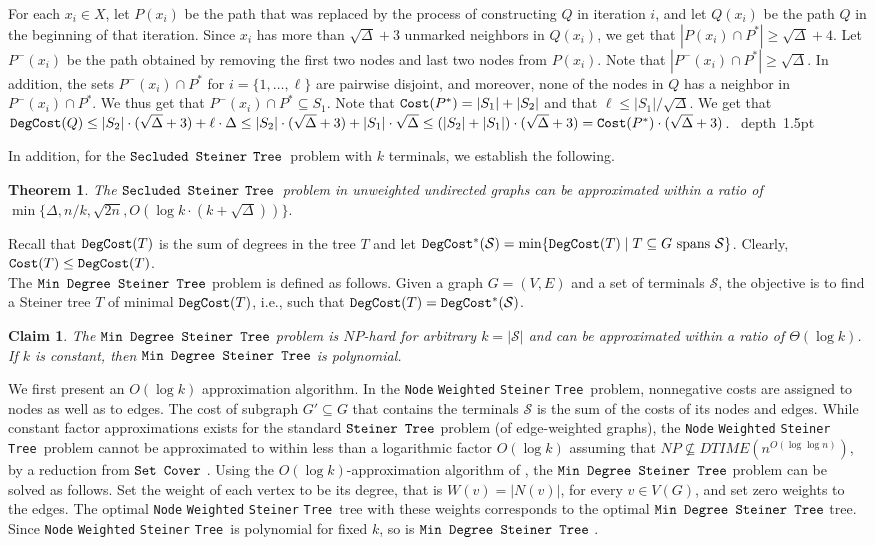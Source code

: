 \documentclass[12pt]{article}
\newtheorem{theorem}{Theorem}[section]
\newtheorem{claim}{Claim}[section]
\def\Cost{\mbox{\tt Cost}}
\def\Proof{\par\noindent{\bf Proof:~}}
\def\blackslug{\hbox{\hskip 1pt \vrule width 4pt height 8pt
    depth 1.5pt \hskip 1pt}}
\def\QED{\quad\blackslug\lower 8.5pt\null\par}
\newcommand{\MAXDEG}[0]{\Delta}
\newcommand{\PS}[0]{$\mbox{\tt Secluded}$ $\mbox{\tt Steiner}$
$\mbox{\tt Tree}$}
\newcommand{\Terminals}[0]{\mathcal{S}}
\newcommand{\Steiner}[0]{\mbox{\tt Steiner Tree}}
\newcommand{\NodeSteiner}[0]{\mbox{\tt Node} \mbox{\tt Weighted}
\mbox{\tt Steiner} \mbox{\tt Tree}}
\newcommand{\PSDeg}[0]{\mbox{\tt Min Degree Steiner Tree}}
\newcommand{\SC}[0]{\mbox{\tt Set Cover}}
\def\Cost{\mbox{\tt Cost}}
\def\DegCost{\mbox{\tt DegCost}}
\def\OptDegCost{\DegCost^{*}}
\begin{document}
For each $x_i \in X$, let $P(x_i)$ be the path that was replaced by the process of constructing $Q$ in iteration $i$, and let $Q(x_i)$ be the path $Q$ in the beginning of that iteration.
Since $x_i$ has more than $\sqrt{\MAXDEG} +3$ unmarked neighbors in $Q(x_i)$, we get that $|P(x_i) \cap P^*| \geq \sqrt{\MAXDEG} +4$.
Let $P^{-}(x_i)$ be the path obtained by removing the first two nodes and last two nodes from $P(x_i)$.
Note that $|P^{-}(x_i) \cap P^*| \geq \sqrt{\MAXDEG}$.
In addition, the sets $P^{-}(x_i) \cap P^*$ for $i=\{1, \ldots, \ell\}$ are pairwise disjoint, and moreover, none of the nodes in $Q$ has a neighbor in $P^{-}(x_i) \cap P^*$.
We thus get that $P^{-}(x_i) \cap P^* \subseteq S_1$.
Note that $\Cost(P^*) = |S_1| + |S_2|$ and that $\ell \leq  |S_1| /\sqrt{\MAXDEG}$.
We get that $\DegCost(Q) \leq |S_2| \cdot (\sqrt{\MAXDEG}+3) +
\ell \cdot \MAXDEG \leq |S_2| \cdot (\sqrt{\MAXDEG}+3) + |S_1| \cdot \sqrt{\MAXDEG} \leq (|S_2|+|S_1|) \cdot (\sqrt{\MAXDEG}+3) = \Cost(P^*)\cdot (\sqrt{\MAXDEG}+3)$.
\QED

In addition, for the \PS\ problem with $k$ terminals, we establish the following.
\begin{theorem}
\label{thm:steiner_delta_approx}
The \PS\ problem in unweighted undirected graphs can be approximated within a ratio of
$\min\{\MAXDEG, n/k, \sqrt{2n}, O(\log k \cdot (k+\sqrt{\MAXDEG}))\}.$
\end{theorem}
Recall that $\DegCost(T)$ is the sum of degrees in the tree $T$ and
let $\OptDegCost(\Terminals)=\min\{\DegCost(T) \mid T \subseteq G \text{~spans~} \Terminals\}$. Clearly, $\Cost(T)\leq \DegCost(T)$. \\The $\PSDeg$ problem is defined as follows. Given a graph $G=(V,E)$ and a set of terminals $\Terminals$, the objective is to find a Steiner tree $T$ of minimal $\DegCost(T)$, i.e., such that $\DegCost(T)=\OptDegCost(\Terminals)$.
\begin{claim}
\label{cl:degcost_approx}
The $\PSDeg$ problem is $NP$-hard for arbitrary $k=|\Terminals|$ and can be approximated within a ratio of $\Theta(\log k)$. If $k$ is constant, then $\PSDeg$ is polynomial.
\end{claim}
\Proof
We first present an $O(\log k)$ approximation algorithm.
In the \NodeSteiner\ problem, nonnegative costs are assigned to nodes as well as to edges. The cost of subgraph $G' \subseteq G$ that contains the terminals $\Terminals$ is the sum of the costs of its nodes and edges. While constant factor approximations exists for the standard $\Steiner$ problem (of edge-weighted graphs), the \NodeSteiner\ problem cannot be approximated to within less than a logarithmic factor $O(\log k)$ assuming that $NP \nsubseteq DTIME(n^{O(\log\log n)})$, by a reduction from $\SC$ \cite{Feige98,KleinR95}.
Using the $O(\log k)$-approximation algorithm of  \cite{Feige98}, the $\PSDeg$ problem can be solved as follows. Set the weight of each vertex to be its degree, that is $W(v)=|N(v)|$, for every $v \in V(G)$, and set zero weights to the edges.
The optimal \NodeSteiner\ tree with these weights corresponds to the optimal $\PSDeg$ tree. Since \NodeSteiner\ is polynomial for fixed $k$, so is $\PSDeg$ \cite{KleinR95}.
\end{document}
